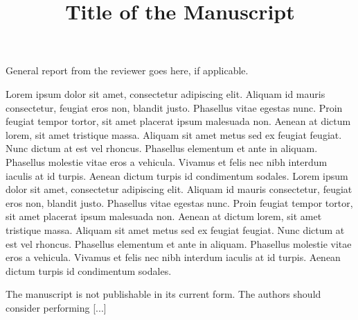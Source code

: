 \documentclass[11pt]{article}
\begin{document}
\title{Title of the Manuscript}



\header

\helper



\newreviewer

General report from the reviewer goes here, if applicable.

\newcomment



\begin{changes}[10-20]
     Lorem ipsum dolor sit amet, consectetur adipiscing elit. Aliquam id mauris consectetur, feugiat eros non, blandit justo. Phasellus vitae egestas nunc. Proin feugiat tempor tortor, sit amet placerat ipsum malesuada non. Aenean at dictum lorem, sit amet tristique massa. Aliquam sit amet metus sed ex feugiat feugiat. Nunc dictum at est vel rhoncus. Phasellus elementum et ante in aliquam. Phasellus molestie vitae eros a vehicula. Vivamus et felis nec nibh interdum iaculis at id turpis. Aenean dictum turpis id condimentum sodales. Lorem ipsum dolor sit amet, consectetur adipiscing elit. Aliquam id mauris consectetur, feugiat eros non, blandit justo. Phasellus vitae egestas nunc. Proin feugiat tempor tortor, sit amet placerat ipsum malesuada non. Aenean at dictum lorem, sit amet tristique massa. Aliquam sit amet metus sed ex feugiat feugiat. Nunc dictum at est vel rhoncus. Phasellus elementum et ante in aliquam. Phasellus molestie vitae eros a vehicula. Vivamus et felis nec nibh interdum iaculis at id turpis. Aenean dictum turpis id condimentum sodales.
\end{changes}

\newcomment



\newreviewer

The manuscript is not publishable in its current form. The authors should consider performing [...]

\newcomment


\end{document}
